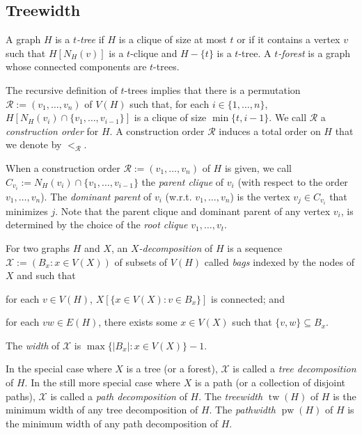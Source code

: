 \documentclass[kpfonts]{patmorin}
\DeclareMathOperator{\tw}{tw}
\DeclareMathOperator{\pw}{pw}
\theoremstyle{named}
\begin{document}
\subsection{Treewidth}

A graph $H$ is a \emph{$t$-tree} if $H$ is a clique of size at most $t$ or if it contains a vertex $v$ such that $H[N_H(v)]$ is a $t$-clique and $H-\{t\}$ is a $t$-tree.  A \emph{$t$-forest} is a graph whose connected components are $t$-trees.

The recursive definition of $t$-trees implies that there is a permutation $\mathcal{R}:=(v_1,\ldots,v_n)$ of $V(H)$ such that, for each $i\in\{1,\ldots,n\}$, $H[N_H(v_i)\cap \{v_1,\ldots,v_{i-1}\}]$ is a clique of size $\min\{t,i-1\}$.  We call $\mathcal{R}$ a \emph{construction order} for $H$.  A construction order $\mathcal{R}$ induces a total order on $H$ that we denote by $<_{\mathcal{R}}$.

When a construction order $\mathcal{R}:=(v_1,\ldots,v_n)$ of $H$ is given, we call $C_{v_i}:=N_H(v_i)\cap \{v_1,\ldots,v_{i-1}\}$ the \emph{parent clique} of $v_i$ (with respect to the order $v_1,\ldots,v_n$).  The \emph{dominant parent} of $v_i$ (w.r.t. $v_1,\ldots,v_n$) is the vertex $v_j\in C_{v_i}$ that minimizes $j$. Note that the parent clique and dominant parent of any vertex $v_i$, is determined by the choice of the \emph{root clique} $v_1,\ldots,v_{t}$.

For two graphs $H$ and $X$, an \emph{$X$-decomposition} of $H$ is a sequence $\mathcal{X}:=(B_x:x\in V(X))$ of subsets of $V(H)$ called \emph{bags} indexed by the nodes of $X$ and such that
 \begin{inparaenum}[(i)]
     \item for each $v\in V(H)$, $X[\{x\in V(X):v\in B_x\}]$ is connected; and
     \item for each $vw\in E(H)$, there exists some $x\in V(X)$ such that $\{v,w\}\subseteq B_x$.
\end{inparaenum}
The \emph{width} of $\mathcal{X}$ is $\max\{|B_x|:x\in V(X)\}-1$.

In the special case where $X$ is a tree (or a forest), $\mathcal{X}$ is called a \emph{tree decomposition} of $H$.  In the still more special case where $X$ is a path (or a collection of disjoint paths), $\mathcal{X}$ is called a \emph{path decomposition} of $H$. The \emph{treewidth} $\tw(H)$ of $H$ is the minimum width of any tree decomposition of $H$. The \emph{pathwidth} $\pw(H)$ of $H$ is the minimum width of any path decomposition of $H$.
\end{document}
